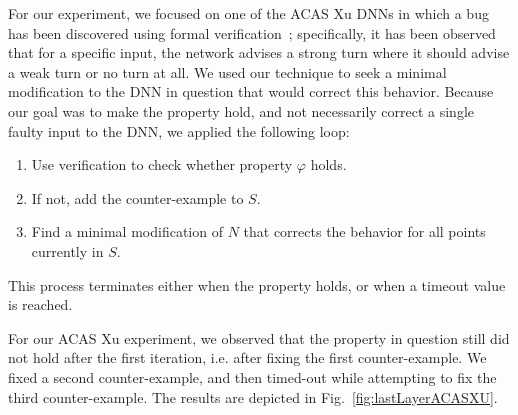 \documentclass{easychair}
\begin{document}
For our experiment, we focused on one of the ACAS Xu DNNs in which a
bug has been discovered using formal
verification~\cite{KaBaDiJuKo17Reluplex}; specifically, it has been
observed that for a specific input, the network advises a strong turn
where it should advise a weak turn or no turn at all. We used our
technique to seek a minimal modification to the DNN in question that
would correct this behavior. Because our goal was to make the property
hold, and not necessarily correct a single faulty input to the DNN, we
applied the following loop:

\begin{enumerate}
\item Use verification to check whether property $\varphi$ holds.
\item If not, add the counter-example to $S$.
\item Find a minimal modification of $N$ that corrects the behavior
  for  all points currently in $S$.
\end{enumerate}

This process terminates either when the property holds, or when a
timeout value is reached. 

For our ACAS Xu experiment, we observed that the property in question
still did not hold after the first iteration, i.e. after fixing the
first counter-example. We fixed a second counter-example, and then
timed-out while attempting to fix the third counter-example.
The results are depicted in Fig.~\ref{fig:lastLayerACASXU}.
\end{document}
